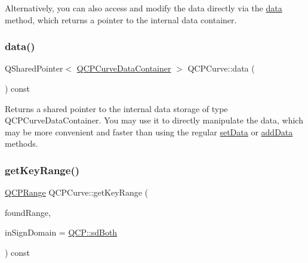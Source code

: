 Alternatively, you can also access and modify the data directly via the \mbox{\hyperlink{class_q_c_p_curve_a761492fd00b1ab7cb18ce23c118c6c60}{data}} method, which returns a pointer to the internal data container. \mbox{\label{class_q_c_p_curve_a761492fd00b1ab7cb18ce23c118c6c60}} 
\subsubsection{\texorpdfstring{data()}{data()}}
{\footnotesize\ttfamily Q\+Shared\+Pointer$<$ \mbox{\hyperlink{class_q_c_p_data_container}{Q\+C\+P\+Curve\+Data\+Container}} $>$ Q\+C\+P\+Curve\+::data (\begin{DoxyParamCaption}{ }\end{DoxyParamCaption}) const\hspace{0.3cm}{\ttfamily [inline]}}

Returns a shared pointer to the internal data storage of type Q\+C\+P\+Curve\+Data\+Container. You may use it to directly manipulate the data, which may be more convenient and faster than using the regular \mbox{\hyperlink{class_q_c_p_curve_a41246850d2e080bc57183ca19cd4135e}{set\+Data}} or \mbox{\hyperlink{class_q_c_p_curve_a73edf394b94f3f24f07518e30565a07f}{add\+Data}} methods. \mbox{\label{class_q_c_p_curve_a22d09087f78f254731197cc0b8783299}} 
\subsubsection{\texorpdfstring{get\+Key\+Range()}{getKeyRange()}}
{\footnotesize\ttfamily \mbox{\hyperlink{class_q_c_p_range}{Q\+C\+P\+Range}} Q\+C\+P\+Curve\+::get\+Key\+Range (\begin{DoxyParamCaption}\item[{bool \&}]{found\+Range,  }\item[{\mbox{\hyperlink{namespace_q_c_p_afd50e7cf431af385614987d8553ff8a9}{Q\+C\+P\+::\+Sign\+Domain}}}]{in\+Sign\+Domain = {\ttfamily \mbox{\hyperlink{namespace_q_c_p_afd50e7cf431af385614987d8553ff8a9aa38352ef02d51ddfa4399d9551566e24}{Q\+C\+P\+::sd\+Both}}} }\end{DoxyParamCaption}) const\hspace{0.3cm}{\ttfamily [virtual]}}

